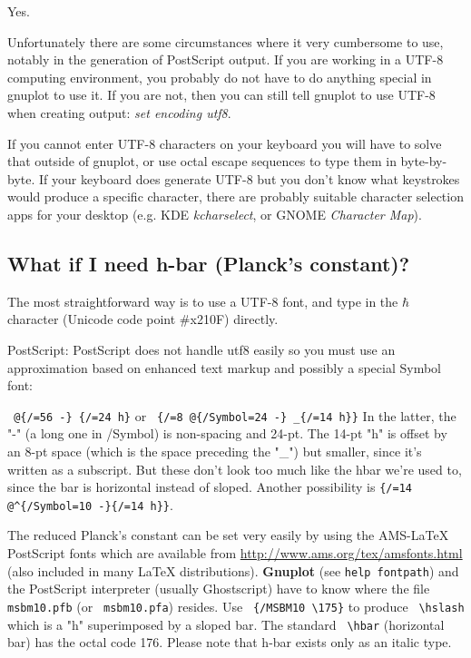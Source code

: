 \documentclass[a4paper,11pt]{article}
\def\http#1{{\small\href{http://#1}{\url{http://#1}}}}
\newcommand{\http}[1]%
            {\htmladdnormallink{\latex{\url{http://#1}}%
                    \html{\textit{http://#1}}}%
                {http://#1}%
            }
\newcommand{\Gnuplot}{\textbf{Gnuplot }}
\begin{document}
Yes.

Unfortunately there are some circumstances where it very cumbersome to use,
notably in the generation of PostScript output.
If you are working in a UTF-8 computing environment, you probably do not have to
do anything special in gnuplot to use it.
If you are not, then you can still tell gnuplot to use UTF-8 when creating output:
{\em set encoding utf8}.  

If you cannot enter UTF-8 characters on your
keyboard you will have to solve that outside of gnuplot, or use octal escape 
sequences to type them in byte-by-byte.  If your keyboard does generate UTF-8
but you don't know what keystrokes would produce a specific character, there 
are probably suitable character selection apps for your desktop
(e.g. KDE {\em kcharselect}, or GNOME {\em Character Map}).

\subsection{What if I need h-bar (Planck's constant)?}

The most straightforward way is to use a UTF-8 font, and type in the
$\hbar$ character (Unicode code point \#x210F) directly. 
 
PostScript: PostScript does not handle utf8 easily so you must use an
approximation based on enhanced text markup and possibly a special
Symbol font:

\verb+ @{/=56 -} {/=24 h}+ or
\verb+ {/=8 @{/Symbol=24 -} _{/=14 h}}+
In the latter, the "-" (a long one in /Symbol) is non-spacing and 24-pt.
The 14-pt "h" is offset by an 8-pt space (which is the space preceding
the "\_") but smaller, since it's written as a subscript.
But these don't look too much like the hbar we're used to, since the bar
is horizontal instead of sloped.
Another possibility is \verb+{/=14 @^{/Symbol=10 -}{/=14 h}}+.

The reduced Planck's constant can be set very easily by using the
AMS-LaTeX PostScript fonts which are available from
\http{www.ams.org/tex/amsfonts.html} (also included in many LaTeX
distributions). \Gnuplot{} (see \verb+help fontpath+) and the
PostScript interpreter (usually Ghostscript) have to know where the
file \verb+ msbm10.pfb+ (or \verb+ msbm10.pfa+) resides. Use
\verb+ {/MSBM10 \175}+ to produce \verb+ \hslash+ which is a "h"
superimposed by a sloped bar. The standard \verb+ \hbar+ (horizontal
bar) has the octal code 176. Please note that h-bar exists only as an
italic type.
\end{document}
